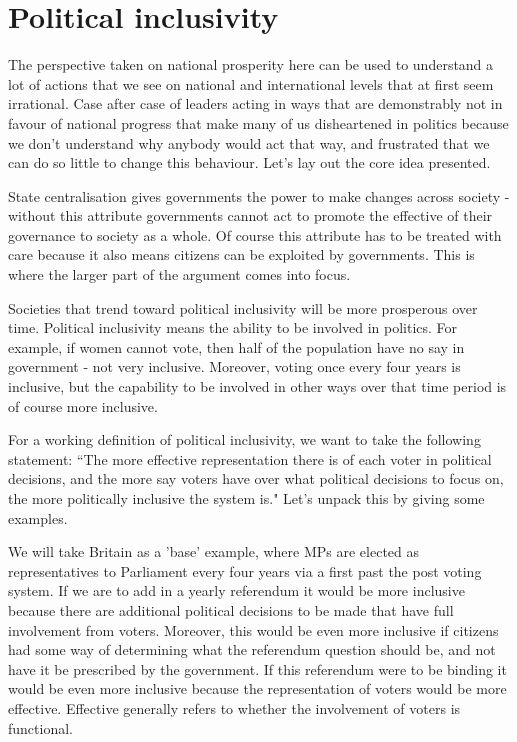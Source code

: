 \documentclass[twoside]{article}
\begin{document}
\section{Political inclusivity}

The perspective taken on national prosperity here can be used to understand a lot of actions that we see on national and international levels that at first seem irrational. Case after case of leaders acting in ways that are demonstrably not in favour of national progress that make many of us disheartened in politics because we don’t understand why anybody would act that way, and frustrated that we can do so little to change this behaviour. Let’s lay out the core idea presented.

State centralisation gives governments the power to make changes across society - without this attribute governments cannot act to promote the effective of their governance to society as a whole. Of course this attribute has to be treated with care because it also means citizens can be exploited by governments. This is where the larger part of the argument comes into focus.

Societies that trend toward political inclusivity will be more prosperous over time. Political inclusivity means the ability to be involved in politics. For example, if women cannot vote, then half of the population have no say in government - not very inclusive. Moreover, voting once every four years is inclusive, but the capability to be involved in other ways over that time period is of course more inclusive.

For a working definition of political inclusivity, we want to take the following statement: ``The more effective representation there is of each voter in political decisions, and the more say voters have over what political decisions to focus on, the more politically inclusive the system is." Let's unpack this by giving some examples.

We will take Britain as a 'base' example, where MPs are elected as representatives to Parliament every four years via a first past the post voting system. If we are to add in a yearly referendum it would be more inclusive because there are additional political decisions to be made that have full involvement from voters. Moreover, this would be even more inclusive if citizens had some way of determining what the referendum question should be, and not have it be prescribed by the government. If this referendum were to be binding it would be even more inclusive because the representation of voters would be more effective. Effective generally refers to whether the involvement of voters is functional.
\end{document}
